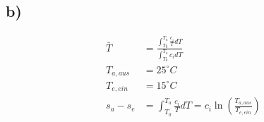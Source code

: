 

\subsection*{b)}
\begin{align*}
\bar{T} &= \frac{\int_{T_0}^{T_a} \frac{c_i}{T} dT}{\int_{T_0}^{T_a} c_i dT} \\
T_{a, aus} &= 25^\circ C \\
T_{e, ein} &= 15^\circ C \\
s_{a} - s_{e} &= \int_{T_0}^{T_a} \frac{c_i}{T} dT = c_i \ln \left( \frac{T_{a, aus}}{T_{e, ein}} \right)
\end{align*}
